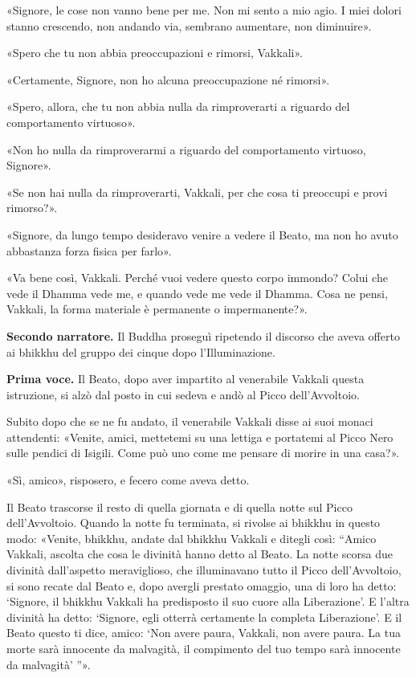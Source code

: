 «Signore, le cose non vanno bene per me. Non mi sento a mio agio. I miei
dolori stanno crescendo, non andando via, sembrano aumentare, non
diminuire».


«Spero che tu non abbia preoccupazioni e rimorsi, Vakkali».


«Certamente, Signore, non ho alcuna preoccupazione né rimorsi».


«Spero, allora, che tu non abbia nulla da rimproverarti a riguardo del
comportamento virtuoso».


«Non ho nulla da rimproverarmi a riguardo del comportamento virtuoso,
Signore».


«Se non hai nulla da rimproverarti, Vakkali, per che cosa ti preoccupi e
provi rimorso?».


«Signore, da lungo tempo desideravo venire a vedere il Beato, ma non ho
avuto abbastanza forza fisica per farlo».


«Va bene così, Vakkali. Perché vuoi vedere questo corpo immondo? Colui
che vede il Dhamma vede me, e quando vede me vede il Dhamma. Cosa ne
pensi, Vakkali, la forma materiale è permanente o impermanente?».


\textbf{Secondo narratore.} Il Buddha proseguì ripetendo il discorso che aveva
offerto ai bhikkhu del gruppo dei cinque dopo l’Illuminazione.


\textbf{Prima voce.} Il Beato, dopo aver impartito al venerabile Vakkali questa
istruzione, si alzò dal posto in cui sedeva e andò al Picco
dell’Avvoltoio.


Subito dopo che se ne fu andato, il venerabile Vakkali disse ai suoi
monaci attendenti: «Venite, amici, mettetemi su una lettiga e portatemi
al Picco Nero sulle pendici di Isigili. Come può uno come me pensare di
morire in una casa?».


«Sì, amico», risposero, e fecero come aveva detto.


Il Beato trascorse il resto di quella giornata e di quella notte sul
Picco dell’Avvoltoio. Quando la notte fu terminata, si rivolse ai
bhikkhu in questo modo: «Venite, bhikkhu, andate dal bhikkhu Vakkali e
ditegli così: “Amico Vakkali, ascolta che cosa le divinità hanno detto
al Beato. La notte scorsa due divinità dall’aspetto meraviglioso, che
illuminavano tutto il Picco dell’Avvoltoio, si sono recate dal Beato e,
dopo avergli prestato omaggio, una di loro ha detto: ‘Signore, il
bhikkhu Vakkali ha predisposto il suo cuore alla Liberazione’. E l’altra
divinità ha detto: ‘Signore, egli otterrà certamente la completa
Liberazione’. E il Beato questo ti dice, amico: ‘Non avere paura,
Vakkali, non avere paura. La tua morte sarà innocente da malvagità, il
compimento del tuo tempo sarà innocente da malvagità’ ”».


